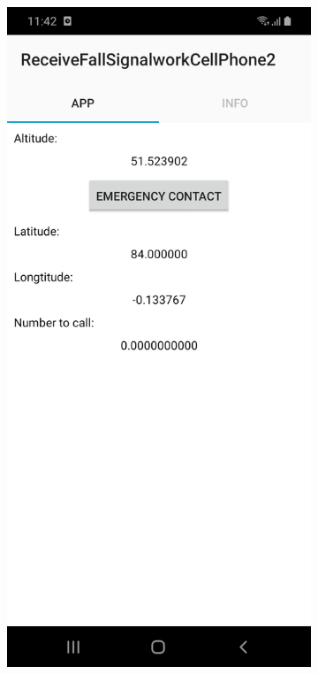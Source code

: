 \documentclass[12pt,a4paper]{article}
\begin{document}
\begin{figure}[h]
    \centering
    \begin{subfigure}[t]{0.4\textwidth}
        \centering
        \includegraphics[width=\textwidth]{files/Interface.jpeg}

\end{subfigure}
\end{figure}
\end{document}
